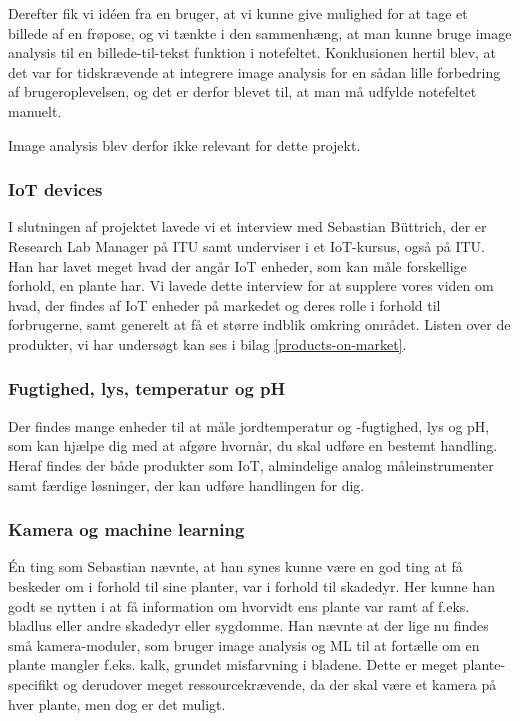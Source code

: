 Derefter fik vi idéen fra en bruger, at vi kunne give mulighed for at tage et billede af en frøpose, og vi tænkte i den sammenhæng, at man kunne bruge image analysis til en billede-til-tekst funktion i notefeltet. Konklusionen hertil blev, at det var for tidskrævende at integrere image analysis for en sådan lille forbedring af brugeroplevelsen, og det er derfor blevet til, at man må udfylde notefeltet manuelt. 

Image analysis blev derfor ikke relevant for dette projekt.

\subsubsection{IoT devices}
I slutningen af projektet lavede vi et interview med Sebastian Büttrich, der er Research Lab Manager på ITU samt underviser i et IoT-kursus, også på ITU. Han har lavet meget hvad der angår IoT enheder, som kan måle forskellige forhold, en plante har. Vi lavede dette interview for at supplere vores viden om hvad, der findes af IoT enheder på markedet og deres rolle i forhold til forbrugerne, samt generelt at få et større indblik omkring området. Listen over de produkter, vi har undersøgt kan ses i bilag \ref{products-on-market}.

\subsubsection*{Fugtighed, lys, temperatur og pH}
Der findes mange enheder til at måle jordtemperatur og -fugtighed, lys og pH, som kan hjælpe dig med at afgøre hvornår, du skal udføre en bestemt handling. Heraf findes der både produkter som IoT, almindelige analog måleinstrumenter samt færdige løsninger, der kan udføre handlingen for dig.

\subsubsection*{Kamera og machine learning}
Én ting som Sebastian nævnte, at han synes kunne være en god ting at få beskeder om i forhold til sine planter, var i forhold til skadedyr. Her kunne han godt se nytten i at få information om hvorvidt ens plante var ramt af f.eks. bladlus eller andre skadedyr eller sygdomme. Han nævnte at der lige nu findes små kamera-moduler, som bruger image analysis og ML til at fortælle om en plante mangler f.eks. kalk, grundet misfarvning i bladene. Dette er meget plante-specifikt og derudover meget ressourcekrævende, da der skal være et kamera på hver plante, men dog er det muligt.

